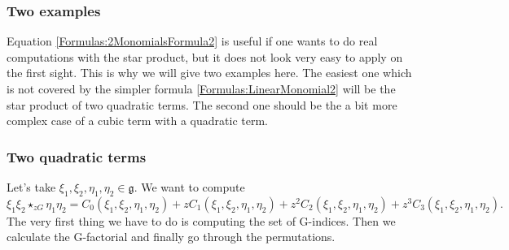 \subsubsection*{Two examples}
Equation \eqref{Formulas:2MonomialsFormula2} is useful if one wants to do 
real computations with the star product, but it does not look very easy to 
apply on the first sight. This is why we will give two examples here. The 
easiest one which is not covered by the simpler formula 
\eqref{Formulas:LinearMonomial2} will be the star product of two quadratic 
terms. The second one should be the a bit more complex case of a cubic term 
with a quadratic term.

\subsubsection*{Two quadratic terms}
Let's take $\xi_1, \xi_2, \eta_1, \eta_2 \in \mathfrak{g}$. We want to 
compute
\begin{equation*}
	\xi_1 \xi_2 \star_{zG} \eta_1 \eta_2
	=
	C_0(\xi_1, \xi_2, \eta_1, \eta_2) 
	+ 
	z C_1(\xi_1, \xi_2, \eta_1, \eta_2) 
	+ 
	z^2 C_2(\xi_1, \xi_2, \eta_1, \eta_2) 
	+ 
	z^3 C_3(\xi_1, \xi_2, \eta_1, \eta_2).
\end{equation*}
The very first thing we have to do is computing the set of G-indices. Then we 
calculate the G-factorial and finally go through the permutations.
